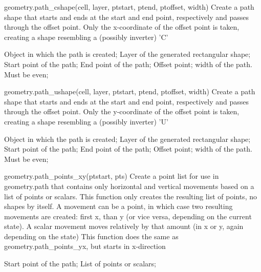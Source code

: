 \begin{APIfunc}{geometry.path\_cshape(cell, layer, ptstart, ptend, ptoffset, width)}
    Create a path shape that starts and ends at the start and end point, respectively and passes through the offset point. Only the x-coordinate of the offset point is taken, creating a shape resembling a (possibly inverter) 'C'
    \begin{APIparameters}
            Object in which the path is created;
            Layer of the generated rectangular shape;
            Start point of the path;
            End point of the path;
            Offset point;
            width of the path. Must be even;
    \end{APIparameters}
\end{APIfunc}
\begin{APIfunc}{geometry.path\_ushape(cell, layer, ptstart, ptend, ptoffset, width)}
    Create a path shape that starts and ends at the start and end point, respectively and passes through the offset point. Only the y-coordinate of the offset point is taken, creating a shape resembling a (possibly inverter) 'U'
    \begin{APIparameters}
            Object in which the path is created;
            Layer of the generated rectangular shape;
            Start point of the path;
            End point of the path;
            Offset point;
            width of the path. Must be even;
    \end{APIparameters}
\end{APIfunc}
\begin{APIfunc}{geometry.path\_points\_xy(ptstart, pts)}
    Create a point list for use in geometry.path that contains only horizontal and vertical movements based on a list of points or scalars.
This function only creates the resulting list of points, no shapes by itself.
A movement can be a point, in which case two resulting movements are created: first x, than y (or vice versa, depending on the current state).
A scalar movement moves relatively by that amount (in x or y, again depending on the state)
This function does the same as geometry.path\_points\_yx, but starts in x-direction
    \begin{APIparameters}
            Start point of the path;
            List of points or scalars;
    \end{APIparameters}
\end{APIfunc}
